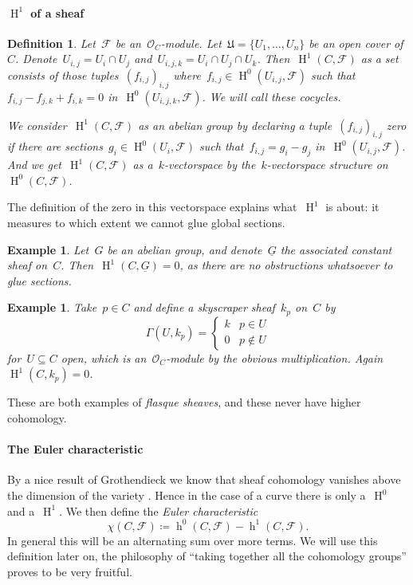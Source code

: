 \documentclass[10pt,a4paper]{article}
\theoremstyle{lecture}
\newtheorem{definition}[theorem]{Definition}
\newtheorem{example}[theorem]{Example}
\newcommand\dash{\nobreakdash-\hspace{0pt}}
\DeclareMathOperator\hh{h}
\DeclareMathOperator\HH{H}
\begin{document}
\paragraph{$\HH^1$ of a sheaf}
\begin{definition}
  Let~$\mathcal{F}$ be an~$\mathcal{O}_C$\dash module. Let~$\mathfrak{U}=\{U_1,\dotsc,U_n\}$ be an open cover of~$C$. Denote~$U_{i,j}=U_i\cap U_j$ and~$U_{i,j,k}=U_i\cap U_j\cap U_k$. Then~$\HH^1(C,\mathcal{F})$ \emph{as a set} consists of those tuples~$(f_{i,j})_{i,j}$ where~$f_{i,j}\in\HH^0(U_{i,j},\mathcal{F})$ such that~$f_{i,j}-f_{j,k}+f_{i,k}=0$ in~$\HH^0(U_{i,j,k},\mathcal{F})$. We will call these \emph{cocycles}.

  We consider~$\HH^1(C,\mathcal{F})$ \emph{as an abelian group} by declaring a tuple~$(f_{i,j})_{i,j}$ zero if there are sections~$g_i\in\HH^0(U_i,\mathcal{F})$ such that~$f_{i,j}=g_i-g_j$ in~$\HH^0(U_{i,j},\mathcal{F})$. And we get~$\HH^1(C,\mathcal{F})$ \emph{as a~$k$\dash vectorspace} by the~$k$\dash vectorspace structure on~$\HH^0(C,\mathcal{F})$.
\end{definition}
The definition of the zero in this vectorspace explains what~$\HH^1$ is about: it measures to which extent we cannot glue global sections.
\begin{example}
  Let~$G$ be an abelian group, and denote~$\underline{G}$ the associated constant sheaf on~$C$. Then~$\HH^1(C,\underline{G})=0$, as there are no obstructions whatsoever to glue sections.
\end{example}
\begin{example}
  Take~$p\in C$ and define a \emph{skyscraper sheaf}~$k_p$ on~$C$ by
  \begin{equation}
    \Gamma(U,k_p)=
    \begin{cases}
      k & p\in U \\
      0 & p\notin U
    \end{cases}
  \end{equation}
  for~$U\subseteq C$ open, which is an~$\mathcal{O}_C$\dash module by the obvious multiplication. Again~$\HH^1(C,k_p)=0$.
\end{example}
These are both examples of \emph{flasque sheaves}, and these never have higher cohomology.

\paragraph{The Euler characteristic}
By a nice result of Grothendieck we know that sheaf cohomology vanishes above the dimension of the variety \cite[theorem III.2.7]{hartshorne}. Hence in the case of a curve there is only a~$\HH^0$ and a~$\HH^1$. We then define the \emph{Euler characteristic}
\begin{equation}
  \chi(C,\mathcal{F})\coloneqq\hh^0(C,\mathcal{F})-\hh^1(C,\mathcal{F}).
\end{equation}
In general this will be an alternating sum over more terms. We will use this definition later on, the philosophy of ``taking together all the cohomology groups'' proves to be very fruitful.
\end{document}
